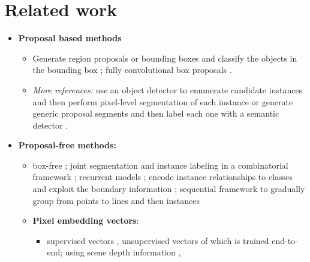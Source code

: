 
\section{Related work}
\begin{itemize}
\item \textbf{Proposal based methods} 
\begin{itemize}
\item Generate region proposals or bounding boxes and classify the objects in the bounding box \cite{yang2012layered,ladicky2010and,hariharan2014simultaneous,chen2015multi,dai2016instance,liang2016reversible,he2017mask}; fully convolutional  box proposals \cite{li2017fully}. 
\item \emph{More references:} use an object detector to enumerate candidate instances and then perform pixel-level segmentation of each instance \cite{liang2018proposal,dai2016instance,li2017fully,liang2016reversible,arnab2017pixelwise} or generate generic proposal segments and then label each one with a semantic detector \cite{hariharan2014simultaneous,chen2015multi,hariharan2015hypercolumns,dai2015convolutional,uhrig2016pixel,he2017mask}.
\end{itemize}

\item \textbf{Proposal-free methods:} 
\begin{itemize}
\item box-free \cite{pinheiro2015learning,pinheiro2016learning,hu2017fastmask}; joint segmentation and instance labeling in a combinatorial framework \cite{kirillov2017instancecut}; recurrent models \cite{romera2016recurrent,ren2017end}; encode instance relationships to classes and exploit the boundary information  \cite{jin2016object}; sequential framework to gradually group from points to lines and then instances \cite{liu2017sgn}
\item \textbf{Pixel embedding vectors}: 
\begin{itemize}
\item supervised vectors \cite{bai2017deep}, unsupervised vectors  \cite{kong2018recurrent,fathi2017semantic,newell2017associative,de2017semantic} of which \cite{kong2018recurrent} is trained end-to-end;  using scene depth information \cite{uhrig2016pixel},  


\end{itemize}
\end{itemize}
\end{itemize}

